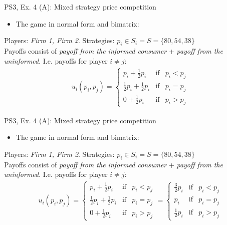 \begin{frame}{PS3, Ex. 4 (A): Mixed strategy price competition}
    \begin{itemize}
      \item[(a)] The game in normal form and bimatrix:
    \end{itemize}
    Players: \textit{Firm 1, Firm 2}. Strategies: $p_i\in S_i = S = \{80, 54, 38\}$\\\medskip
    Payoffs consist of \textit{payoff from the informed consumer} + \textit{payoff from the uninformed}.
    I.e. payoffs for player $i\neq j$:
    \begin{align*}
      u_i(p_i,p_j)=
      \left\{ \begin{array}{rcl}
      p_i + \frac{1}{2}p_i & \mbox{if} & p_i < p_j \\
      \frac{1}{2}p_i + \frac{1}{2}p_i & \mbox{if} & p_i = p_j \\
      0 + \frac{1}{2}p_i & \mbox{if} & p_i > p_j
      \end{array}\right.
    \end{align*}
  \vfill\null
\end{frame}
\begin{frame}{PS3, Ex. 4 (A): Mixed strategy price competition}
    \begin{itemize}
      \item[(a)] The game in normal form and bimatrix:
    \end{itemize}
    Players: \textit{Firm 1, Firm 2}. Strategies: $p_i\in S_i = S = \{80, 54, 38\}$\\\medskip
    Payoffs consist of \textit{payoff from the informed consumer} + \textit{payoff from the uninformed}.
    I.e. payoffs for player $i\neq j$:
    \begin{align*}
      u_i(p_i,p_j)=
      \left\{ \begin{array}{rcl}
      p_i + \frac{1}{2}p_i & \mbox{if} & p_i < p_j \\
      \frac{1}{2}p_i + \frac{1}{2}p_i & \mbox{if} & p_i = p_j \\
      0 + \frac{1}{2}p_i & \mbox{if} & p_i > p_j
      \end{array}\right.
      =
      \left\{ \begin{array}{rcl}
      \frac{3}{2}p_i & \mbox{if} & p_i < p_j \\
                 p_i & \mbox{if} & p_i = p_j \\
      \frac{1}{2}p_i & \mbox{if} & p_i > p_j
      \end{array}\right.
    \end{align*}
  \vfill\null
\end{frame}
